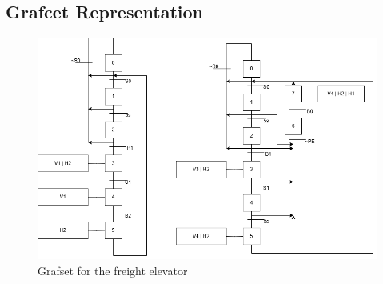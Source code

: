 \subsection{Grafcet Representation} \label{sec:Grafcet_Representation}

\begin{figure}[H]
    \includegraphics[width=16cm]{Images/Q4/graftset.png}
    \centering
    \caption{Grafset for the freight elevator}
    \label{fig:grafset}
\end{figure}

